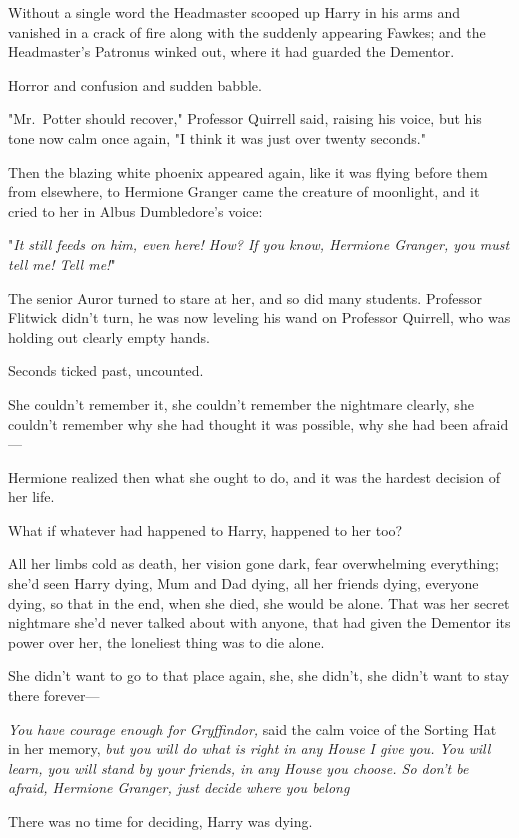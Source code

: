 Without a single word the Headmaster scooped up Harry in his arms and vanished
in a crack of fire along with the suddenly appearing Fawkes; and the
Headmaster's Patronus winked out, where it had guarded the Dementor.

Horror and confusion and sudden babble.

"Mr.~Potter should recover," Professor Quirrell said, raising his voice, but
his tone now calm once again, "I think it was just over twenty seconds."

Then the blazing white phoenix appeared again, like it was flying before them
from elsewhere, to Hermione Granger came the creature of moonlight, and it
cried to her in Albus Dumbledore's voice:

"\emph{It still feeds on him, even here! How? If you know, Hermione Granger,
you must tell me! Tell me!}"

The senior Auror turned to stare at her, and so did many students. Professor
Flitwick didn't turn, he was now leveling his wand on Professor Quirrell, who
was holding out clearly empty hands.

Seconds ticked past, uncounted.

She couldn't remember it, she couldn't remember the nightmare clearly, she
couldn't remember why she had thought it was possible, why she had been
afraid---

Hermione realized then what she ought to do, and it was the hardest decision of
her life.

What if whatever had happened to Harry, happened to her too?

All her limbs cold as death, her vision gone dark, fear overwhelming
everything; she'd seen Harry dying, Mum and Dad dying, all her friends dying,
everyone dying, so that in the end, when she died, she would be alone. That was
her secret nightmare she'd never talked about with anyone, that had given the
Dementor its power over her, the loneliest thing was to die alone.

She didn't want to go to that place again, she, she didn't, she didn't want to
stay there forever---

\emph{You have courage enough for Gryffindor,} said the calm voice of the
Sorting Hat in her memory, \emph{but you will do what is right in any House I
give you. You will learn, you will stand by your friends, in any House you
choose. So don't be afraid, Hermione Granger, just decide where you
belong{\el}}

There was no time for deciding, Harry was dying.

